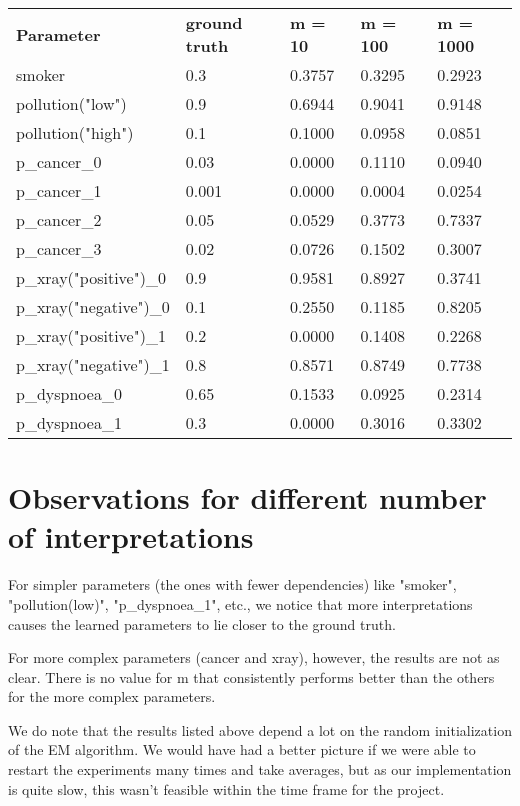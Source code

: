 \begin{table}[H]
    \centering
    \begin{tabular}{l|l|l|l|l|}
        \textbf{Parameter} & \textbf{ground truth} & \textbf{m = 10} & \textbf{m = 100} & \textbf{m = 1000} \\
        \cline{1-5}

        smoker                 & 0.3   & 0.3757 & 0.3295 & 0.2923 \\
        pollution("low")       & 0.9   & 0.6944 & 0.9041 & 0.9148 \\
        pollution("high")      & 0.1   & 0.1000 & 0.0958 & 0.0851 \\
        p\_cancer\_0           & 0.03  & 0.0000 & 0.1110 & 0.0940 \\
        p\_cancer\_1           & 0.001 & 0.0000 & 0.0004 & 0.0254 \\
        p\_cancer\_2           & 0.05  & 0.0529 & 0.3773 & 0.7337 \\
        p\_cancer\_3           & 0.02  & 0.0726 & 0.1502 & 0.3007 \\
        p\_xray("positive")\_0 & 0.9   & 0.9581 & 0.8927 & 0.3741 \\
        p\_xray("negative")\_0 & 0.1   & 0.2550 & 0.1185 & 0.8205 \\
        p\_xray("positive")\_1 & 0.2   & 0.0000 & 0.1408 & 0.2268 \\
        p\_xray("negative")\_1 & 0.8   & 0.8571 & 0.8749 & 0.7738 \\
        p\_dyspnoea\_0         & 0.65  & 0.1533 & 0.0925 & 0.2314 \\
        p\_dyspnoea\_1         & 0.3   & 0.0000 & 0.3016 & 0.3302 \\

    \end{tabular}
\end{table}

\section{Observations for different number of interpretations}
For simpler parameters (the ones with fewer dependencies) like "smoker", "pollution(low)", "p\_dyspnoea\_1", etc., we notice that more interpretations causes the learned parameters to lie closer to the ground truth.

For more complex parameters (cancer and xray), however, the results are not as clear. There is no value for m that consistently performs better than the others for the more complex parameters.

We do note that the results listed above depend a lot on the random initialization of the EM algorithm. We would have had a better picture if we were able to restart the experiments many times and take averages, but as our implementation is quite slow, this wasn't feasible within the time frame for the project.